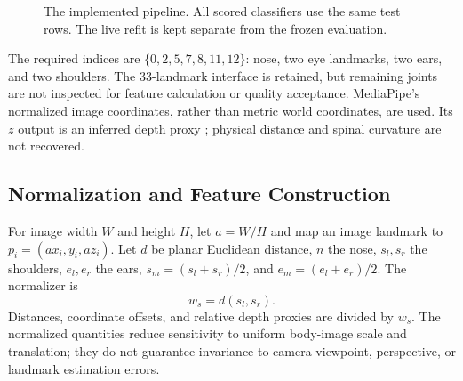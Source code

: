 \documentclass[conference]{IEEEtran}
\begin{document}
\begin{figure}[t]\centering
{}
\caption{The implemented pipeline. All scored classifiers use the same test rows. The live refit is kept separate from the frozen evaluation.}
\label{fig:pipeline}\end{figure}

The required indices are $\{0,2,5,7,8,11,12\}$: nose, two eye landmarks, two ears, and two shoulders. The 33-landmark interface is retained, but remaining joints are not inspected for feature calculation or quality acceptance. MediaPipe's normalized image coordinates, rather than metric world coordinates, are used. Its $z$ output is an inferred depth proxy \cite{poseguide}; physical distance and spinal curvature are not recovered.

\subsection{Normalization and Feature Construction}
For image width $W$ and height $H$, let $a=W/H$ and map an image landmark to $p_i=(ax_i,y_i,az_i)$. Let $d$ be planar Euclidean distance, $n$ the nose, $s_l,s_r$ the shoulders, $e_l,e_r$ the ears, $s_m=(s_l+s_r)/2$, and $e_m=(e_l+e_r)/2$. The normalizer is
\begin{equation}
w_s=d(s_l,s_r).
\end{equation}
Distances, coordinate offsets, and relative depth proxies are divided by $w_s$. The normalized quantities reduce sensitivity to uniform body-image scale and translation; they do not guarantee invariance to camera viewpoint, perspective, or landmark estimation errors.
\end{document}
